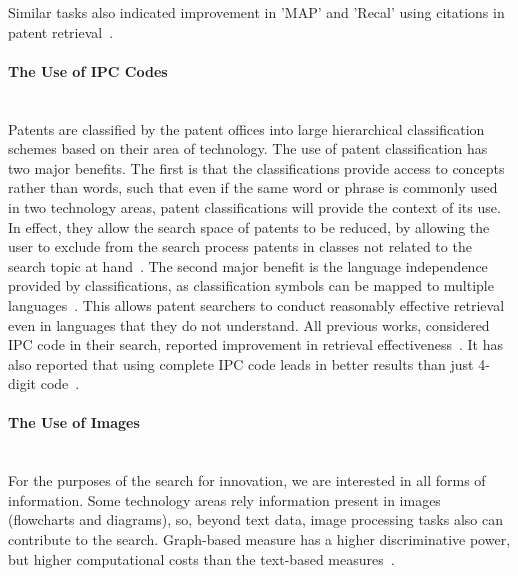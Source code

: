 Similar tasks also indicated improvement in 'MAP' and 'Recal' using citations in patent retrieval~\citep{gobeill2010simple, gurulingappa2010prior}. 
\paragraph{The Use of IPC Codes}
\ \\
Patents are classified by the patent offices into large hierarchical classification schemes based on their area of technology. The use of patent
classification has two major benefits. The first is that the classifications provide access to concepts rather than words, such that even
if the same word or phrase is commonly used in two technology areas, patent classifications will provide the context of its use. In effect, they
allow the search space of patents to be reduced, by allowing the user to exclude from the search process patents in classes not related to
the search topic at hand~\citep{lopez2010patatras}. The second major benefit is the language independence provided by classifications, as classification symbols can be mapped to multiple languages~\citep{DBLP:conf/clef/DhondtV10}. This allows patent searchers to conduct reasonably effective retrieval even in languages that they do not understand. All previous works, considered IPC code in their search, reported improvement in retrieval effectiveness~\citep{harris2010comparison, harris2011using, harris2009role, fujita2005revisiting, graf2010knowledge, herbert2010prior, kang2007cluster, verma2011applying}. It has also reported that using complete IPC code leads in better results than just 4-digit code~\citep{ gobeill2010simple}.
\paragraph{The Use of Images}
\ \\
For the purposes of the search for innovation, we are interested in all forms of information. Some technology areas rely information present in images (flowcharts and diagrams), so, beyond text data, image processing tasks also can contribute to the search. Graph-based measure has a higher discriminative power, but higher computational costs than the text-based measures~\citep{lupu2013evaluating}.
